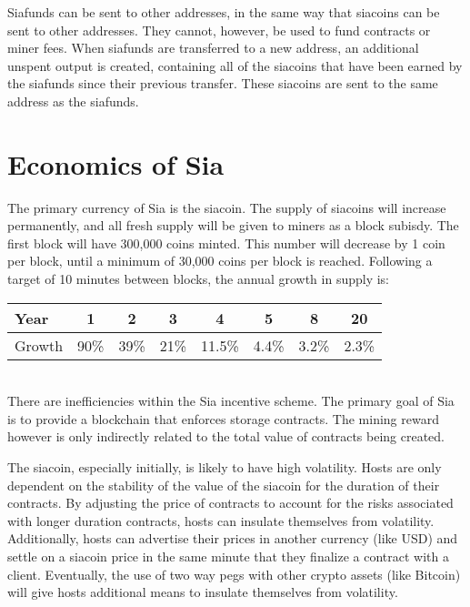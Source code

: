 \documentclass[twocolumn]{article}
\begin{document}
Siafunds can be sent to other addresses, in the same way that siacoins can be sent to other addresses.
They cannot, however, be used to fund contracts or miner fees.
When siafunds are transferred to a new address, an additional unspent output is created, containing all of the siacoins that have been earned by the siafunds since their previous transfer.
These siacoins are sent to the same address as the siafunds.

\section{Economics of Sia}
The primary currency of Sia is the siacoin.
The supply of siacoins will increase permanently, and all fresh supply will be given to miners as a block subisdy.
The first block will have 300,000 coins minted.
This number will decrease by 1 coin per block, until a minimum of 30,000 coins per block is reached.
Following a target of 10 minutes between blocks, the annual growth in supply is:\\

\tabcolsep=0.11cm \noindent
\begin{tabular}{ l | *{7}{c} }
	Year   &   1  &  2   &   3  &   4    &   5   &  8    & 20    \\ \hline
	Growth & 90\% & 39\% & 21\% & 11.5\% & 4.4\% & 3.2\% & 2.3\%
\end{tabular} \\

There are inefficiencies within the Sia incentive scheme.
The primary goal of Sia is to provide a blockchain that enforces storage contracts.
The mining reward however is only indirectly related to the total value of contracts being created.

The siacoin, especially initially, is likely to have high volatility.
Hosts are only dependent on the stability of the value of the siacoin for the duration of their contracts.
By adjusting the price of contracts to account for the risks associated with longer duration contracts, hosts can insulate themselves from volatility.
Additionally, hosts can advertise their prices in another currency (like USD) and settle on a siacoin price in the same minute that they finalize a contract with a client.
Eventually, the use of two way pegs with other crypto assets (like Bitcoin) will give hosts additional means to insulate themselves from volatility.

\end{document}
